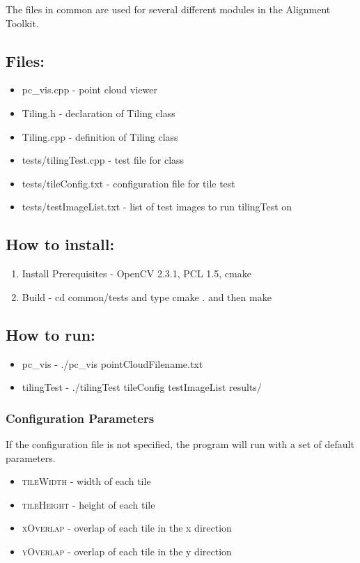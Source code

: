 The files in common are used for several different modules in the Alignment Toolkit.

\subsection{Files:}
\begin{itemize}
\item{pc\_vis.cpp} - point cloud viewer
\item{Tiling.h} - declaration of Tiling class
\item{Tiling.cpp} - definition of Tiling class
\item{tests/tilingTest.cpp} - test file for class
\item{tests/tileConfig.txt} - configuration file for tile test
\item{tests/testImageList.txt} - list of test images to run tilingTest on
\end{itemize}

\subsection{How to install:}
\begin{enumerate}
	\item{Install Prerequisites} - OpenCV 2.3.1, PCL 1.5, cmake 
	\item{Build} - cd common/tests and type cmake . and then make
\end{enumerate}

\subsection{How to run:}
\begin{itemize}
	\item{pc\_vis} - ./pc\_vis pointCloudFilename.txt
	\item{tilingTest} - ./tilingTest tileConfig testImageList results/
\end{itemize}
\subsubsection{Configuration Parameters}
If the configuration file is not specified, the program will run with a set of default parameters.
\begin{itemize}
	\item{\textsc{tileWidth}} - width of each tile
	\item{\textsc{tileHeight}} - height of each tile
	\item{\textsc{xOverlap}} - overlap of each tile in the x direction
	\item{\textsc{yOverlap}} - overlap of each tile in the y direction
\end{itemize}



